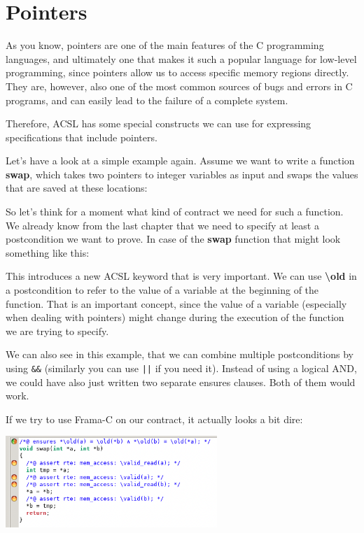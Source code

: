 \chapter{Pointers}

As you know, pointers are one of the main features of the C programming languages, and ultimately one that makes it such a popular language for low-level programming, since pointers allow us to access specific memory regions directly. They are, however, also one of the most common sources of bugs and errors in C programs, and can easily lead to the failure of a complete system. 

Therefore, ACSL has some special constructs we can use for expressing specifications that include pointers. 

Let's have a look at a simple example again. Assume we want to write a function \textbf{swap}, which takes two pointers to integer variables as input and swaps the values that are saved at these locations:


So let's think for a moment what kind of contract we need for such a function. We already know from the last chapter that we need to specify at least a postcondition we want to prove. In case of the \textbf{swap} function that might look something like this:


This introduces a new ACSL keyword that is very important. We can use \textbf{\textbackslash old} in a postcondition to refer to the value of a variable at the beginning of the function. That is an important concept, since the value of a variable (especially when dealing with pointers) might change during the execution of the function we are trying to specify. 

We can also see in this example, that we can combine multiple postconditions by using \texttt{&&} (similarly you can use \texttt{||} if you need it). Instead of using a logical AND, we could have also just written two separate ensures clauses. Both of them would work. 

If we try to use Frama-C on our contract, it actually looks a bit dire:

\begin{center}
    \includegraphics[width=0.6\textwidth]{images/frama_c_swap_post.png}
\end{center}

